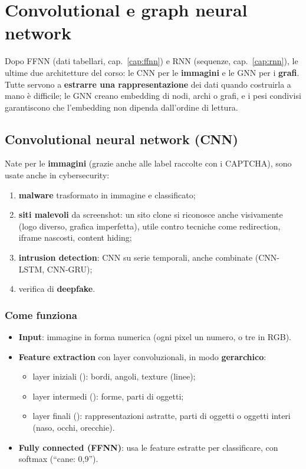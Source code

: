 \chapter{Convolutional e graph neural network}
\label{cap:cnn-gnn}

Dopo FFNN (dati tabellari, cap.~\ref{cap:ffnn}) e RNN (sequenze, cap.~\ref{cap:rnn}), le ultime due architetture del corso:
le CNN per le \textbf{immagini} e le GNN per i \textbf{grafi}. Tutte servono a \textbf{estrarre una rappresentazione} dei dati
quando costruirla a mano è difficile; le GNN creano embedding di nodi, archi o grafi, e i pesi condivisi garantiscono che
l'embedding non dipenda dall'ordine di lettura.

\section{Convolutional neural network (CNN)}
Nate per le \textbf{immagini} (grazie anche alle label raccolte con i CAPTCHA), sono usate anche in cybersecurity:
\begin{enumerate}
  \item \textbf{malware} trasformato in immagine e classificato;
  \item \textbf{siti malevoli} da screenshot: un sito clone si riconosce anche visivamente (logo diverso, grafica imperfetta),
        utile contro tecniche come redirection, iframe nascosti, content hiding;
  \item \textbf{intrusion detection}: CNN su serie temporali, anche combinate (CNN-LSTM, CNN-GRU);
  \item verifica di \textbf{deepfake}.
\end{enumerate}

\subsection{Come funziona}
\begin{itemize}
  \item \textbf{Input}: immagine in forma numerica (ogni pixel un numero, o tre in RGB).
  \item \textbf{Feature extraction} con layer convoluzionali, in modo \textbf{gerarchico}:
  \begin{itemize}
    \item layer iniziali (): bordi, angoli, texture (linee);
    \item layer intermedi (): forme, parti di oggetti;
    \item layer finali (): rappresentazioni astratte, parti di oggetti o oggetti interi (naso, occhi, orecchie).
  \end{itemize}
  \item \textbf{Fully connected (FFNN)}: usa le feature estratte per classificare, con softmax (``cane: 0,9'').
\end{itemize}

